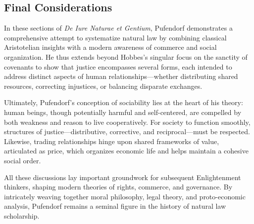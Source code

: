     \subsection*{Final Considerations}

        In these sections of \textit{De Iure Naturae et Gentium}, Pufendorf demonstrates a comprehensive attempt to systematize natural law by combining classical Aristotelian insights with a modern awareness of commerce and social organization. He thus extends beyond Hobbes’s singular focus on the sanctity of covenants to show that justice encompasses several forms, each intended to address distinct aspects of human relationships—whether distributing shared resources, correcting injustices, or balancing disparate exchanges.

        Ultimately, Pufendorf’s conception of sociability lies at the heart of his theory: human beings, though potentially harmful and self-centered, are compelled by both weakness and reason to live cooperatively. For society to function smoothly, structures of justice—distributive, corrective, and reciprocal—must be respected. Likewise, trading relationships hinge upon shared frameworks of value, articulated as price, which organizes economic life and helps maintain a cohesive social order.

        All these discussions lay important groundwork for subsequent Enlightenment thinkers, shaping modern theories of rights, commerce, and governance. By intricately weaving together moral philosophy, legal theory, and proto-economic analysis, Pufendorf remains a seminal figure in the history of natural law scholarship.